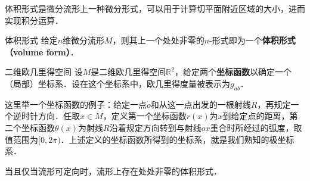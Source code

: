 



体积形式是微分流形上一种微分形式，可以用于计算切平面附近区域的大小，进而实现积分运算．

\begin{definition}{体积形式}
给定$n$维微分流形$M$，则其上一个处处非零的$n$-形式即为一个\textbf{体积形式（volume form）}．
\end{definition}

\begin{example}{二维欧几里得空间}
设$M$是二维欧几里得空间$\mathbb{R}^2$，给定两个\textbf{坐标函数}以确定一个（局部）坐标系．设在这个坐标系中，欧几里得度量被表示为$g_{ab}$．

这里举一个坐标函数的例子：给定一点$o$和从这一点出发的一根射线$R$，再规定一个逆时针方向．任取$x\in M$，定义第一个坐标函数$r(x)$为$x$到给定点的距离，第二个坐标函数$\theta(x)$为射线$R$沿着规定方向转到与射线$ox$重合时所经过的弧度，取值范围为$[0, 2\pi)$．上述定义的坐标函数所得到的坐标系，就是我们熟知的极坐标系．


\end{example}






\begin{theorem}{}
当且仅当流形可定向时，流形上存在处处非零的体积形式．
\end{theorem}






















